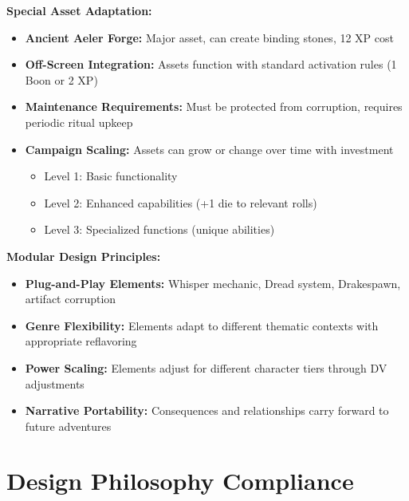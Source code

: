 \documentclass[11pt]{article}
\begin{document}
\begin{itemize}
\begin{itemize}
\begin{itemize}
\begin{itemize}
\textbf{Special Asset Adaptation:} \begin{itemize} \item \textbf{Ancient Aeler Forge:} Major asset, can create binding stones, 12 XP cost \item \textbf{Off-Screen Integration:} Assets function with standard activation rules (1 Boon or 2 XP) \item \textbf{Maintenance Requirements:} Must be protected from corruption, requires periodic ritual upkeep \item \textbf{Campaign Scaling:} Assets can grow or change over time with investment \begin{itemize} \item Level 1: Basic functionality \item Level 2: Enhanced capabilities (+1 die to relevant rolls) \item Level 3: Specialized functions (unique abilities) \end{itemize} \end{itemize}

\textbf{Modular Design Principles:} \begin{itemize} \item \textbf{Plug-and-Play Elements:} Whisper mechanic, Dread system, Drakespawn, artifact corruption \item \textbf{Genre Flexibility:} Elements adapt to different thematic contexts with appropriate reflavoring \item \textbf{Power Scaling:} Elements adjust for different character tiers through DV adjustments \item \textbf{Narrative Portability:} Consequences and relationships carry forward to future adventures \end{itemize}

\section{Design Philosophy Compliance}


\end{itemize}
\end{itemize}
\end{itemize}
\end{itemize}
\end{document}
